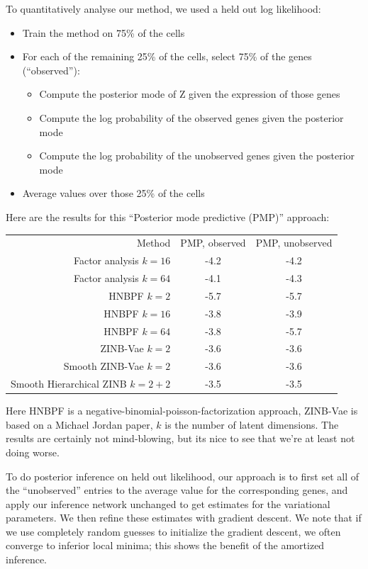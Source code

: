 To quantitatively analyse our method, we used a held out log likelihood:

\begin{itemize}
\item Train the method on 75\% of the cells
\item For each of the remaining 25\% of the cells, select 75\% of the genes (``observed''):
  \begin{itemize}
  \item Compute the posterior mode of Z given the expression of those genes
  \item Compute the log probability of the observed genes given the posterior mode
  \item Compute the log probability of the unobserved genes given the posterior mode
  \end{itemize}
\item Average values over those 25\% of the cells
\end{itemize}

Here are the results for this ``Posterior mode predictive (PMP)'' approach:

\begin{tabular}{r|cc}
Method & PMP, observed & PMP, unobserved \\
Factor analysis $k=16$ & -4.2 & -4.2 \\
Factor analysis $k=64$ & -4.1 & -4.3 \\
HNBPF $k=2$ & -5.7 & -5.7 \\
HNBPF $k=16$ & -3.8 & -3.9 \\
HNBPF $k=64$ & -3.8 & -5.7 \\
ZINB-Vae $k=2$ & -3.6 & -3.6 \\
Smooth ZINB-Vae $k=2$ & -3.6 & -3.6 \\
Smooth Hierarchical ZINB $k=2+2$ & -3.5 & -3.5 \\
\hline
\end{tabular}

Here HNBPF is a negative-binomial-poisson-factorization approach, ZINB-Vae is based on a Michael Jordan paper, $k$ is the number of latent dimensions.  The results are certainly not mind-blowing, but its nice to see that we're at least not doing worse.  

To do posterior inference on held out likelihood, our approach is to first set all of the ``unobserved'' entries to the average value for the corresponding genes, and apply our inference network unchanged to get estimates for the variational parameters.  We then refine these estimates with gradient descent.  We note that if we use completely random guesses to initialize the gradient descent, we often converge to inferior local minima; this shows the benefit of the amortized inference.  

